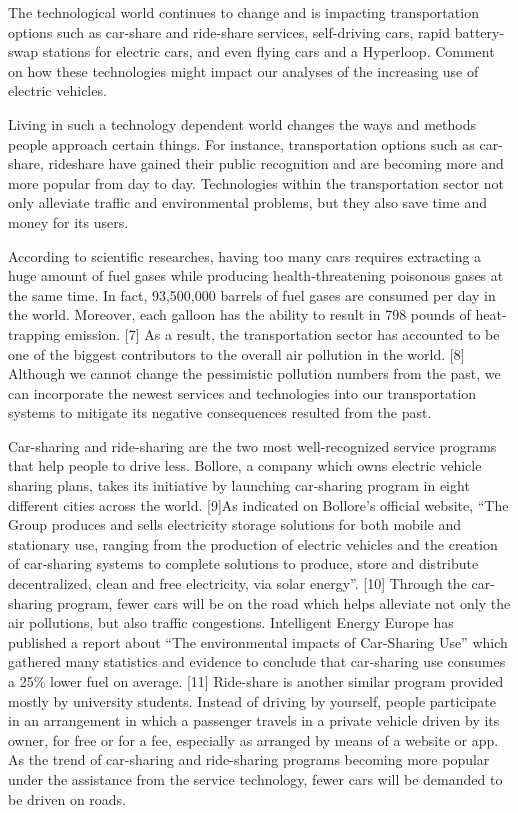 \documentclass{mcmthesis}
\begin{document}
	The technological world continues to change and is impacting transportation options such as car-share and ride-share services, self-driving cars, rapid battery-swap stations for electric cars, and even flying cars and a Hyperloop. Comment on how these technologies might impact our analyses of the increasing use of electric vehicles.
	\par
	Living in such a technology dependent world changes the ways and methods people approach certain things. For instance, transportation options such as car-share, rideshare have gained their public recognition and are becoming more and more popular from day to day. Technologies within the transportation sector not only alleviate traffic and environmental problems, but they also save time and money for its users.
	\par
	According to scientific researches, having too many cars requires extracting a huge amount of fuel gases while producing health-threatening poisonous gases at the same time. In fact, 93,500,000 barrels of fuel gases are consumed per day in the world. Moreover, each galloon has the ability to result in 798 pounds of heat-trapping emission. [7] As a result, the transportation sector has accounted to be one of the biggest contributors to the overall air pollution in the world. [8] Although we cannot change the pessimistic pollution numbers from the past, we can incorporate the newest services and technologies into our transportation systems to mitigate its negative consequences resulted from the past.
	\par
	Car-sharing and ride-sharing are the two most well-recognized service programs that help people to drive less. Bollore, a company which owns electric vehicle sharing plans, takes its initiative by launching car-sharing program in eight different cities across the world. [9]As indicated on Bollore’s official website, “The Group produces and sells electricity storage solutions for both mobile and stationary use, ranging from the production of electric vehicles and the creation of car-sharing systems to complete solutions to produce, store and distribute decentralized, clean and free electricity, via solar energy”. [10] Through the car-sharing program, fewer cars will be on the road which helps alleviate not only the air pollutions, but also traffic congestions. Intelligent Energy Europe has published a report about “The environmental impacts of Car-Sharing Use” which gathered many statistics and evidence to conclude that car-sharing use consumes a 25\% lower fuel on average. [11] Ride-share is another similar program provided mostly by university students. Instead of driving by yourself, people participate in an arrangement in which a passenger travels in a private vehicle driven by its owner, for free or for a fee, especially as arranged by means of a website or app. As the trend of car-sharing and ride-sharing programs becoming more popular under the assistance from the service technology, fewer cars will be demanded to be driven on roads.
\end{document}
